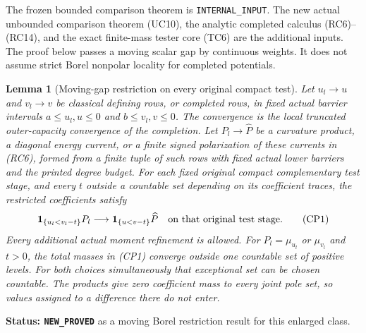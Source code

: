 \documentclass[11pt,a4paper]{article}
\numberwithin{equation}{section}
\newtheorem{lemma}[theorem]{Lemma}
\theoremstyle{definition}
\theoremstyle{remark}
\begin{document}
The frozen bounded comparison theorem is
\texttt{INTERNAL\_INPUT}. The new actual unbounded comparison
theorem (UC10), the analytic completed calculus (RC6)--(RC14),
and the exact finite-mass tester core (TC6) are the additional
inputs. The proof below passes a moving scalar gap by continuous
weights. It does not assume strict Borel nonpolar locality for
completed potentials.

\begin{lemma}[Moving-gap restriction on every original compact test]
\label{lem:r11-completed-moving-gap}
Let $u_l\to u$ and $v_l\to v$ be classical defining rows, or
completed rows, in fixed actual barrier intervals
$a\leq u_l,u\leq0$ and $b\leq v_l,v\leq0$.
The convergence is the local truncated outer-capacity convergence
of the completion. Let $P_l\to\widehat P$ be a curvature
product, a diagonal energy current, or a finite signed
polarization of these currents in (RC6), formed from a finite
tuple of such rows with fixed actual lower barriers and the
printed degree budget.
For each fixed original compact complementary test stage,
and every $t$ outside a countable set depending on its coefficient
traces, the restricted coefficients satisfy
\[
 \mathbf1_{\{u_l<v_l-t\}}P_l
       \longrightarrow \mathbf1_{\{u<v-t\}}\widehat P
 \quad\hbox{on that original test stage}.
 \tag{CP1}
\]
Every additional actual moment refinement is allowed. For
$P_l=\mu_{u_l}$ or $\mu_{v_l}$ and $t>0$, the total masses
in (CP1) converge outside one countable set of positive levels.
For both choices simultaneously that exceptional set can be chosen
countable. The products give zero coefficient mass to every joint
pole set, so values assigned to a difference there do not enter.
\end{lemma}

\noindent\textbf{Status: \texttt{NEW\_PROVED}} as a moving Borel
restriction result for this enlarged class.
\end{document}
